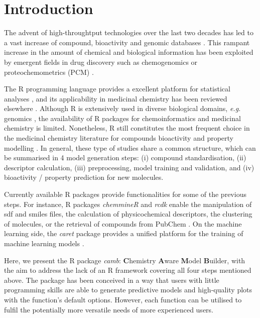 \documentclass{bioinfo}
\begin{document}
\section{Introduction}

The advent of high-throughtput technologies over the last two decades 
has led to a vast increase of compound, bioactivity
and genomic databases \citep{bender_databases}.
This rampant increase in the amount of chemical and biological information 
has been exploited by emergent fields in drug discovery 
such as chemogenomics or proteochemometrics (PCM) \citep{review_pcm,cortesReview}.

The R programming language provides a excellent platform for statistical analyses \citep{Rlanguage},
and its applicability in medicinal chemistry has been reviewed elsewhere \citep{mente}.
Although R is extensively used in diverse biological domains, {\it e.g.} genomics \citep{bioconductor},
the availability of R packages for chemoinformatics and medicinal chemistry is limited. %
Nonetheless, R still constitutes the most frequent choice in the medicinal chemistry literature
for compounds bioactivity and property modelling \citep{mente}.
In general, these type of studies share a common structure, which can be summarised in 4 model generation steps:
(i) compound standardisation, (ii) descriptor calculation,
(iii) preprocessing, model training and validation, and (iv) bioactivity / property prediction for new molecules.

Currently available R packages provide functionalities for some of the previous steps.
For instance, R packages {\it chemmineR} \citep{chemmineR} and {\it rcdk} \citep{rcdk} enable the manipulation of sdf and smiles %
files, the calculation of physicochemical descriptors, the clustering of molecules,
or the retrieval of compounds from PubChem \citep{pubchem}.
On the machine learning side, the {\it caret} package provides a
unified platform for the training of machine learning models \citep{caret}.

Here, we present the R package {\it camb}: {\bf C}hemistry {\bf A}ware {\bf M}odel {\bf B}uilder,
with the aim to address the lack of an R framework covering all four steps mentioned above.
The package has been conceived in a way that users with little
programming skills are able to generate predictive models and high-quality plots
with the function's default options.
However, each function can be utilised to fulfil the potentially more versatile needs of more experienced users.
\end{document}
